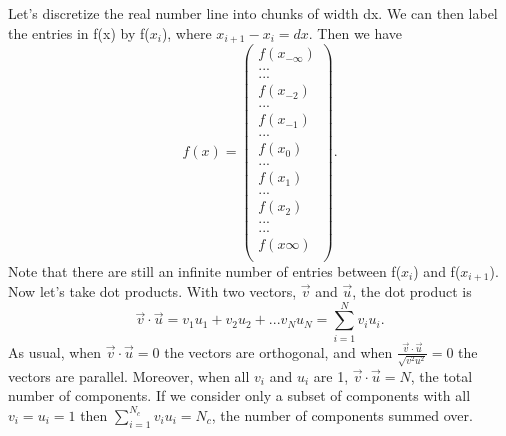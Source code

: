 \documentclass[12pt]{article}
\begin{document}
Let's discretize the real number line into chunks of width dx. We can then label the entries in f(x) by f($x_i$), where $x_{i+1} - x_i = dx$. Then we have  
\begin{equation}
f(x) = 
\begin{pmatrix}
f(x_{-\infty}) \\
... \\
... \\
f(x_{-2}) \\
... \\
f(x_{-1}) \\
... \\
f(x_0) \\
... \\
f(x_1) \\
... \\
f(x_2) \\
... \\
... \\
f(x{\infty}) \\
\end{pmatrix}.
\end{equation}
Note that there are still an infinite number of entries between f($x_i$) and f($x_{i+1}$). Now let's take dot products. With two vectors, $\vec{v}$ and $\vec{u}$, the dot product is 
\begin{equation}
\vec{v} \cdot \vec{u} = v_1 u_1 + v_2 u_2 + ... v_N u_N = \sum_{i=1}^{N} v_i u_i.
\end{equation}
As usual, when $\vec{v} \cdot \vec{u} = 0$ the vectors are orthogonal, and when $\frac{\vec{v} \cdot \vec{u}}{\sqrt{v^2u^2}} = 0$ the vectors are parallel. Moreover, when all $v_i$ and $u_i$ are 1, $\vec{v} \cdot \vec{u} = N$, the total number of components. If we consider only a subset of components with all $v_i = u_i = 1$ then $\sum_{i=1}^{N_c} v_i u_i = N_c$, the number of components summed over. 
\end{document}
